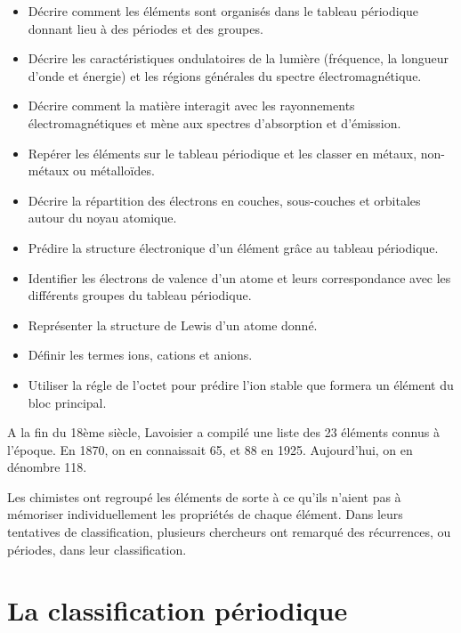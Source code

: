 \documentclass[
  11pt,
  a4paper,
  openany]{book}
\providecommand{\tightlist}{%
  \setlength{\itemsep}{0pt}\setlength{\parskip}{0pt}}
\begin{document}
\begin{objectives}

\begin{itemize}
\tightlist
\item
  Décrire comment les éléments sont organisés dans le tableau périodique donnant lieu à des périodes et des groupes.
\item
  Décrire les caractéristiques ondulatoires de la lumière (fréquence, la longueur d'onde et énergie) et les régions générales du spectre électromagnétique.
\item
  Décrire comment la matière interagit avec les rayonnements électromagnétiques et mène aux spectres d'absorption et d'émission.
\item
  Repérer les éléments sur le tableau périodique et les classer en métaux, non-métaux ou métalloïdes.
\item
  Décrire la répartition des électrons en couches, sous-couches et orbitales autour du noyau atomique.
\item
  Prédire la structure électronique d'un élément grâce au tableau périodique.
\item
  Identifier les électrons de valence d'un atome et leurs correspondance avec les différents groupes du tableau périodique.
\item
  Représenter la structure de Lewis d'un atome donné.
\item
  Définir les termes ions, cations et anions.
\item
  Utiliser la régle de l'octet pour prédire l'ion stable que formera un élément du bloc principal.
\end{itemize}

\end{objectives}

A la fin du 18ème siècle, Lavoisier a compilé une liste des 23 éléments connus à l'époque. En 1870, on en connaissait 65, et 88 en 1925. Aujourd'hui, on en dénombre 118.

Les chimistes ont regroupé les éléments de sorte à ce qu'ils n'aient pas à mémoriser individuellement les propriétés de chaque élément. Dans leurs tentatives de classification, plusieurs chercheurs ont remarqué des récurrences, ou périodes, dans leur classification.

\hypertarget{la-classification-puxe9riodique}{%
\section{La classification périodique}\label{la-classification-puxe9riodique}}
\end{document}
